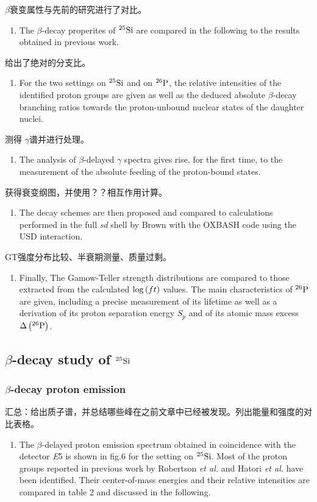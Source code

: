 \documentclass[a4paper]{article}
\begin{document}
$\beta$衰变属性与先前的研究进行了对比。
\begin{enumerate}
    \item The $\beta$-decay properites of $^{25}\textnormal{Si}$ are compared in the following to the results obtained in previous work.
\end{enumerate}
给出了绝对的分支比。
\begin{enumerate}
    \item For the two settings on $^{25}\textnormal{Si}$ and on $^{26}\textnormal{P}$, the relative intensities of the identified proton groups are given as well as the deduced absolute $\beta$-decay branching ratios towards the proton-unbound nuclear states of the daughter nuclei.
\end{enumerate}
测得 $\gamma$谱并进行处理。
\begin{enumerate}
    \item The analysis of $\beta$-delayed $\gamma$ spectra gives rise, for the first time, to the measurement of the absolute feeding of the proton-bound states.
\end{enumerate}
获得衰变纲图，并使用？？相互作用计算。
\begin{enumerate}
    \item The decay schemes are then proposed and compared to calculations performed in the full \textit{sd} shell by Brown with the OXBASH code using the USD interaction.
\end{enumerate}
GT强度分布比较、半衰期测量、质量过剩。
\begin{enumerate}
    \item  Finally, The Gamow-Teller strength distributions are compared to those extracted from the calculated $\textnormal{log}\left( ft \right)$ values. The main characteristics of $^{26}\textnormal{P}$ are given, including a precise measurement of its lifetime as well as a derivation of its proton separation energy $S_{p}$ and of its atomic mass excess $\Delta \left( ^{26}\textnormal{P} \right)$.

\end{enumerate}

\subsection{$\beta$-decay study of $^{25}\textnormal{Si}$}
\subsubsection{$\beta$-decay proton emission}
汇总：给出质子谱，并总结哪些峰在之前文章中已经被发现。列出能量和强度的对比表格。
\begin{enumerate}
    \item The $\beta$-delayed proton emission spectrum obtained in coincidence with the detector \textit{E}5 is shown in fig.6 for the setting on $^{25}\textnormal{Si}$. Most of the proton groups reported in previous work by Robertson \textit{et al.} and Hatori \textit{et al.} have been identified. Their center-of-mass energies and their relative intensities are compared in table 2 and discussed in the following.
\end{enumerate}
\end{document}
